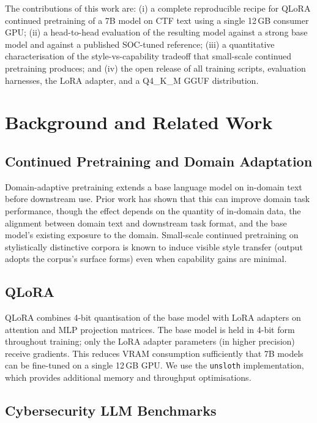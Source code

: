 \documentclass[10pt,twocolumn,a4paper]{article}
\begin{document}
The contributions of this work are: (i) a complete reproducible recipe for QLoRA continued pretraining of a 7B model on CTF text using a single 12\,GB consumer GPU; (ii) a head-to-head evaluation of the resulting model against a strong base model and against a published SOC-tuned reference; (iii) a quantitative characterisation of the style-vs-capability tradeoff that small-scale continued pretraining produces; and (iv) the open release of all training scripts, evaluation harnesses, the LoRA adapter, and a Q4{\_}K{\_}M GGUF distribution.

\section{Background and Related Work}

\subsection{Continued Pretraining and Domain Adaptation}

Domain-adaptive pretraining \cite{gururangan2020dont} extends a base language model on in-domain text before downstream use. Prior work has shown that this can improve domain task performance, though the effect depends on the quantity of in-domain data, the alignment between domain text and downstream task format, and the base model's existing exposure to the domain. Small-scale continued pretraining on stylistically distinctive corpora is known to induce visible style transfer (output adopts the corpus's surface forms) even when capability gains are minimal.

\subsection{QLoRA}

QLoRA \cite{dettmers2023qlora} combines 4-bit quantisation of the base model with LoRA \cite{hu2022lora} adapters on attention and MLP projection matrices. The base model is held in 4-bit form throughout training; only the LoRA adapter parameters (in higher precision) receive gradients. This reduces VRAM consumption sufficiently that 7B models can be fine-tuned on a single 12\,GB GPU. We use the \texttt{unsloth} \cite{unsloth2024} implementation, which provides additional memory and throughput optimisations.

\subsection{Cybersecurity LLM Benchmarks}
\end{document}
